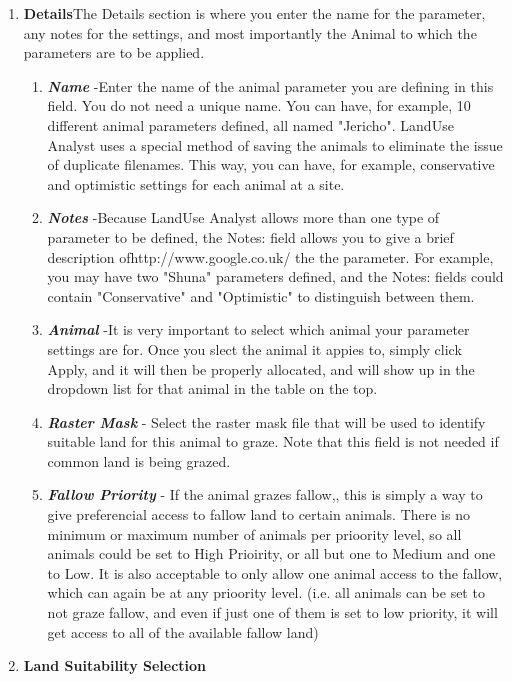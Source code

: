   \begin{enumerate}
    \item \textbf{Details}The Details section is where you enter the name for
the parameter, any notes for the settings, and most importantly the Animal to
which the parameters are to be applied.
      \begin{enumerate}
        \item \textit{\textbf{Name}} -Enter the name of the animal parameter you
are defining in this field. You do not need a unique name. You can have, for
example, 10 different animal parameters defined, all named "Jericho". LandUse
Analyst uses a special method of saving the animals to eliminate the issue of
duplicate filenames. This way, you can have, for example, conservative and
optimistic settings for each animal at a site.
        \item \textit{\textbf{Notes}} -Because LandUse Analyst allows more than
one type of parameter to be defined, the Notes: field allows you to give a brief
description ofhttp://www.google.co.uk/ the the parameter. For example, you may
have two "Shuna" parameters defined, and the Notes: fields could contain
"Conservative" and "Optimistic" to distinguish between them. 
        \item \textit{\textbf{Animal}} -It is very important to select which
animal your parameter settings are for. Once you slect the animal it appies to,
simply click Apply, and it will then be properly allocated, and will show up in
the dropdown list for that animal in the table on the top. 
        \item \textit{\textbf{Raster Mask}} - Select the raster mask file that
will be used to identify suitable land for this animal to graze.  Note that this
field is not needed if common land is being grazed.
        \item \textit{\textbf{Fallow Priority}} - If the animal grazes fallow,,
this is simply a way to give preferencial access to fallow land to certain
animals.  There is no minimum or maximum number of animals per prioority level,
so all animals could be set to High Prioirity, or all but one to Medium and one
to Low.  It is also acceptable to only allow one animal access to the fallow,
which can again be at any prioority level.  (i.e. all animals can be set to not
graze fallow, and even if just one of them is set to low priority, it will get
access to all of the available fallow land)
      \end{enumerate}
    \item \textbf{Land Suitability Selection}

\end{enumerate}
